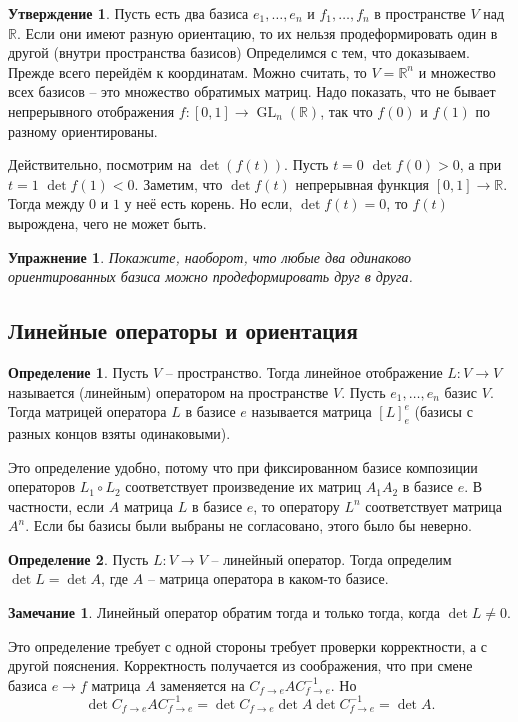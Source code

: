 \documentclass[10pt,a4paper,oneside]{book}
\newtheorem{uprz}{\color{violet!100!black} Упражнение}
\theoremstyle{definition}
\newtheorem*{rem}{\color{green!50!blue}Замечание}
\newtheorem*{defn}{\color{yellow!30!red} Определение}
\newtheorem{utvr}{\color{blue!50!black}Утверждение}
\newcommand{\mb}[1]{\mathbb{#1}}
\newcommand{\GL}{\operatorname{GL}}
\def\dfn{\begin{defn}}
\def\edfn{\end{defn}}
\def\rm{\begin{rem}}
\def\erm{\end{rem}}
\def\utv{\begin{utvr}}
\def\eutv{\end{utvr}}
\def\upr{\begin{uprz}}
\def\eupr{\end{uprz}}
\begin{document}
\utv Пусть есть два базиса $e_1,\dots,e_n$ и $f_1,\dots,f_n$ в пространстве $V$ над $\mb R$. Если они имеют разную ориентацию, то их нельзя продеформировать один в другой (внутри пространства базисов)
\proof Определимся с тем, что доказываем. Прежде всего перейдём к координатам. Можно считать, то $V=\mb R^n$ и множество всех базисов -- это множество обратимых матриц. Надо показать, что не бывает непрерывного отображения $f\colon [0,1] \to \GL_n(\mb R)$, так что $f(0)$ и $f(1)$ по разному ориентированы. 

Действительно, посмотрим на $\det (f(t))$. Пусть $t=0$ $\det f(0)>0$,  а при $t=1$ $\det f(1)<0$. Заметим, что $\det f(t)$ непрерывная функция $[0,1] \to \mb R$. Тогда между $0$ и $1$ у неё есть корень. Но если, $\det f(t)=0$, то $f(t)$ вырождена, чего не может быть.
\endproof
\eutv

\upr Покажите, наоборот, что любые два одинаково ориентированных базиса можно продеформировать друг в друга.
\eupr

\subsection{Линейные операторы и ориентация}

\dfn Пусть $V$ -- пространство. Тогда линейное отображение $L\colon V \to V$ называется (линейным) оператором  на пространстве $V$. Пусть $e_1,\dots, e_n$ базис $V$. Тогда матрицей оператора $L$ в базисе $e$ называется матрица $[L]_e^e$ (базисы с разных концов взяты одинаковыми).
\edfn

Это определение удобно, потому что при фиксированном базисе композиции операторов $L_1\circ L_2$ соответствует произведение их матриц $A_1A_2$ в базисе $e$. В частности, если $A$ матрица $L$ в базисе $e$, то оператору $L^n$ соответствует матрица $A^n$. Если бы базисы были выбраны не согласовано, этого было бы неверно. 

\dfn Пусть $L\colon V \to V$ -- линейный оператор. Тогда определим $\det L=\det A$, где $A$ -- матрица оператора в каком-то базисе.
\edfn

\rm Линейный оператор обратим тогда и только тогда, когда $\det L \neq 0$.
\erm

Это определение требует с одной стороны требует проверки корректности, а с другой пояснения. Корректность получается из соображения, что при смене базиса $e\to f$ матрица $A$ заменяется на $C_{f\to e}A C_{f \to e}^{-1}$. Но
$$\det C_{f\to e}A C_{f \to e}^{-1}= \det C_{f\to e} \det A \det C_{f\to e}^{-1}= \det A.$$
\end{document}
